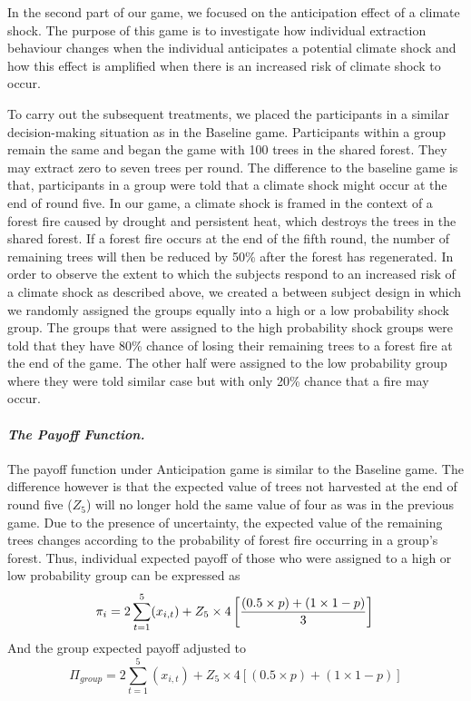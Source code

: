 In the second part of our game, we focused on the anticipation effect of a climate shock. The purpose of this game is to investigate how individual extraction behaviour changes when the individual anticipates a potential climate shock and how this effect is amplified when there is an increased risk of climate shock to occur.

 To carry out the subsequent treatments, we placed the participants in a similar decision-making situation as in the Baseline game. Participants within a group remain the same and began the game with 100 trees in the shared forest. They may extract zero to seven trees per round. The difference to the baseline game is that, participants in a group were told that a climate shock might occur at the end of round five. In our game, a climate shock is framed in the context of a forest fire caused by drought and persistent heat, which destroys the trees in the shared forest. If a forest fire occurs at the end of the fifth round, the number of remaining trees will then be reduced by 50\% after the forest has regenerated. In order to observe the extent to which the subjects respond to an increased risk of a climate shock as described above, we created a between subject design in which we randomly assigned the groups equally into a high or a low probability shock group. The groups that were assigned to the high probability shock groups were told that they have 80\% chance of losing their remaining trees to a forest fire at the end of the game. The other half were assigned to the low probability group where they were told similar case but with only 20\% chance that a fire may occur.

\paragraph{\textit{The Payoff Function.}}

The payoff function under Anticipation game is similar to the Baseline game. The difference however is that the expected value of trees not harvested at the end of round five ($Z_5$) will no longer hold the same value of four as was in the previous game. Due to the presence of uncertainty, the expected value of the remaining trees changes according to the probability of forest fire occurring in a group's forest. Thus, individual expected payoff of those who were assigned to a high or low probability group can be expressed as
\begin{equation}
\label{eq:10}
    \pi_{i} = 2\sum_{t=1}^{5} (x_{i,t})+  Z_{5} \times 4 \left[ \dfrac{(0.5 \times p)+(1 \times 1-p)}{3} \right] \\
\end{equation}
And the group expected payoff adjusted to
\begin{equation}
\label{eq:11}
    \Pi_{group} = 2\sum_{t=1}^{5} (x_{i,t})+ Z_{5} \times 4 \left[ (0.5 \times p)+(1 \times 1-p) \right]
\end{equation}

